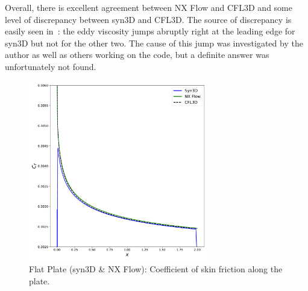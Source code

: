 Overall, there is excellent agreement between NX Flow and CFL3D and some level of discrepancy between syn3D and CFL3D. The source of discrepancy is easily seen in~: the eddy viscosity jumps abruptly right at the leading edge for syn3D but not for the other two. The cause of this jump was investigated by the author as well as others working on the code, but a definite answer was unfortunately not found.
\begin{figure}[ht!]
\centering
	\includegraphics[width=0.7\textwidth]{figs/flat/skin_friction.pdf}
    \caption{Flat Plate (syn3D \& NX Flow): Coefficient of skin friction along the plate.}
    \label{fig:flatcf}
\end{figure}

